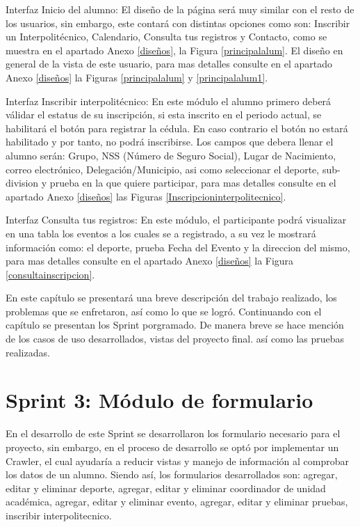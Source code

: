 	\noindent Interfaz Inicio del alumno: El diseño de la página será muy similar con el resto de los usuarios, sin embargo, este contará con distintas opciones como son: Inscribir un Interpolitécnico, Calendario, Consulta tus registros y Contacto, como se muestra en el apartado Anexo \ref{diseños}, la Figura 	\ref{principalalum}. El diseño en general de la vista de este usuario, para mas detalles consulte en el apartado Anexo \ref{diseños} la Figuras \ref{principalalum} y \ref{principalalum1}.
	\newline
	
	\noindent Interfaz Inscribir interpolitécnico: En este módulo el alumno primero deberá válidar el estatus de su inscripción, si esta inscrito en el periodo actual, se habilitará el botón para registrar la cédula. En caso contrario el botón no estará habilitado y por tanto, no podrá inscribirse. Los campos que debera llenar el alumno serán: Grupo, NSS (Número de Seguro Social), Lugar de Nacimiento, correo electrónico, Delegación/Municipio, asi como seleccionar el deporte, sub-division y prueba en la que quiere participar, para mas detalles consulte en el apartado Anexo \ref{diseños} las Figuras \ref{Inscripcioninterpolitecnico}.
	\newline
	
	\noindent Interfaz Consulta tus registros: En este módulo, el participante podrá visualizar en una tabla los eventos a los cuales se a registrado, a su vez le mostrará información como: el deporte, prueba Fecha del Evento y la direccion del mismo, para mas detalles consulte en el apartado Anexo \ref{diseños} la Figura \ref{consultainscripcion}.
	\newline

	\noindent En este capítulo se presentará una breve descripción del trabajo realizado, los problemas que se enfretaron, así como lo que se logró. Continuando con el capítulo se presentan los Sprint porgramado. 
	De manera breve se hace mención de los casos de uso desarrollados, vistas del proyecto final. así como las pruebas realizadas.
	
	\section{Sprint 3: Módulo de formulario}	
	\noindent En el desarrollo de este Sprint se desarrollaron los formulario necesario para el proyecto, sin embargo, en el proceso de desarrollo se optó por implementar un Crawler, el cual ayudaría a reducir vistas y manejo de información al comprobar los datos de un alumno. Siendo así, los formularios desarrollados son: agregar, editar y eliminar deporte, agregar, editar y eliminar coordinador de unidad académica, agregar, editar y eliminar evento, agregar, editar y eliminar pruebas, inscribir interpolitecnico.
		
